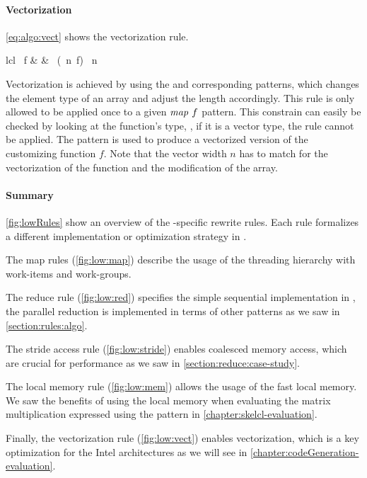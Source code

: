 \paragraph{Vectorization}
\autoref{eq:algo:vect} shows the vectorization rule.
%
\begin{rerule}{lcl}
  \map\ f
    & \rightarrow &
      \asScalar
        \circ \map\ (\vect\ n\ f)
        \circ \asVector\ n
  \label{eq:algo:vect}
\end{rerule}
%
Vectorization is achieved by using the \asVector and corresponding \asScalar patterns, which changes the element type of an array and adjust the length accordingly.
This rule is only allowed to be applied once to a given $\text{\textit{map}}\ f$ pattern.
This constrain can easily be checked by looking at the function's type, \ie, if it is a vector type, the rule cannot be applied.
The \vect pattern is used to produce a vectorized version of the customizing function $f$.
Note that the vector width $n$ has to match for the vectorization of the function and the modification of the array.

\paragraph{Summary}
\autoref{fig:lowRules} show an overview of the \OpenCL-specific rewrite rules.
Each rule formalizes a different implementation or optimization strategy in \OpenCL.

The map rules (\autoref{fig:low:map}) describe the usage of the \OpenCL threading hierarchy with work-items and work-groups.

The reduce rule (\autoref{fig:low:red}) specifies the simple sequential implementation in \OpenCL, the parallel reduction is implemented in terms of other patterns as we saw in \autoref{section:rules:algo}.

The stride access rule (\autoref{fig:low:stride}) enables coalesced memory access, which are crucial for performance as we saw in \autoref{section:reduce:case-study}.

The local memory rule (\autoref{fig:low:mem}) allows the usage of the fast local memory.
We saw the benefits of using the local memory when evaluating the matrix multiplication expressed using the \allpairs pattern in \autoref{chapter:skelcl-evaluation}.

Finally, the vectorization rule (\autoref{fig:low:vect}) enables vectorization, which is a key optimization for the Intel \CPU architectures as we will see in \autoref{chapter:codeGeneration-evaluation}.

